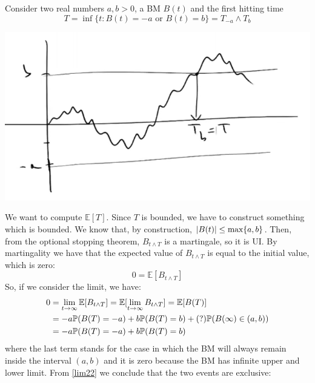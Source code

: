 \begin{example}{}{}{} %
    Consider two real numbers $a,b>0$, a BM $B(t)$ and the first hitting time
    \begin{equation}
        T = \inf\{t:B(t) = -a \text{ or } B(t) = b\} = T_{-a}\wedge T_{b}
    \end{equation}
    \begin{center}
        \includegraphics[scale=0.26]{fig/tmp/fig35.png}
    \end{center}
    We want to compute $\mathbb{E}[T]$. Since $T$ is bounded, we have to construct something which is bounded. We know that, by construction, $\abs{B(t)}\le\max\{a,b\}$. Then, from the optional stopping theorem, $B_{t\wedge T}$ is a martingale, so it is UI. By martingality we have that the expected value of $B_{t\wedge T}$ is equal to the initial value, which is zero:
    \begin{equation*}
        0 = \mathbb{E}[B_{t\wedge T}]
    \end{equation*}
    So, if we consider the limit, we have:
    \begin{align}\label{lim22}
        \notag 0 &= \lim_{t\to\infty}\mathbb{E}[B_{t\wedge T}] = \mathbb{E}[\lim_{t\to\infty} B_{t\wedge T}] = \mathbb{E}[B(T)] \\
        &=
        \notag -a\mathbb{P}(B(T)=-a) + b\mathbb{P}(B(T)=b) + (?)\mathbb{P}(B(\infty)\in(a,b)) \\
        &=
        -a\mathbb{P}(B(T)=-a) + b\mathbb{P}(B(T)=b)
    \end{align}
    where the last term stands for the case in which the BM will always remain inside the interval $(a,b)$ and it is zero because the BM has infinite upper and lower limit. From \eqref{lim22} we conclude that the two events are exclusive:
    \begin{equation}

\end{equation}
\end{example}
